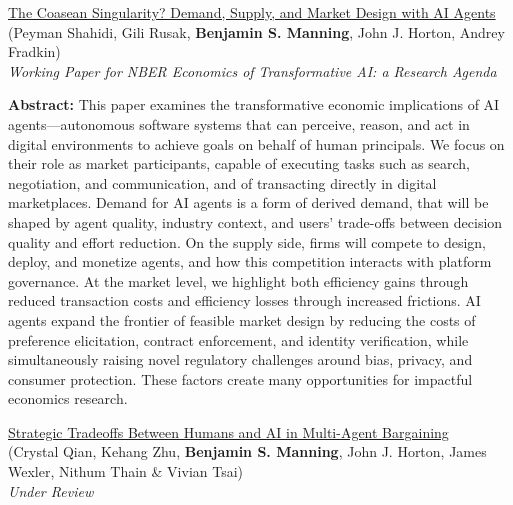 \documentclass[margin,line,pifont,palatino,courier, 9pt]{res}
\begin{document}
\begin{resume}
\href{https://conference.nber.org/conf_papers/f227499.pdf}{The Coasean Singularity? Demand, Supply, and Market Design with AI Agents}\\
(Peyman Shahidi\footnotemark[\value{footnote}], Gili Rusak, \textbf{Benjamin S. Manning}, John J. Horton, Andrey Fradkin)\\
\textit{Working Paper for NBER Economics of Transformative AI: a Research Agenda}

\begin{singlespace}
\footnotesize
\textbf{Abstract: }This paper examines the transformative economic implications of AI agents---autonomous software systems that can perceive, reason, and act in digital environments to achieve goals on behalf of human principals. 
We focus on their role as market participants, capable of executing tasks such as search, negotiation, and communication, and of transacting directly in digital marketplaces. 
Demand for AI agents is a form of derived demand, that will be shaped by agent quality, industry context, and users' trade-offs between decision quality and effort reduction. 
On the supply side, firms will compete to design, deploy, and monetize agents, and how this competition interacts with platform governance. At the market level, we highlight both efficiency gains through reduced transaction costs and efficiency losses through increased frictions. 
AI agents expand the frontier of feasible market design by reducing the costs of preference elicitation, contract enforcement, and identity verification, while simultaneously raising novel regulatory challenges around bias, privacy, and consumer protection. 
These factors create many opportunities for impactful economics research.
\end{singlespace}

\href{https://arxiv.org/abs/2509.09071}{Strategic Tradeoffs Between Humans and AI in Multi-Agent Bargaining}\\
(Crystal Qian\footnotemark[\value{footnote}],  Kehang Zhu\footnotemark[\value{footnote}], \textbf{Benjamin S. Manning}, John J. Horton, James Wexler, Nithum Thain \& Vivian Tsai)\\
\textit{Under Review}


\end{resume}
\end{document}
